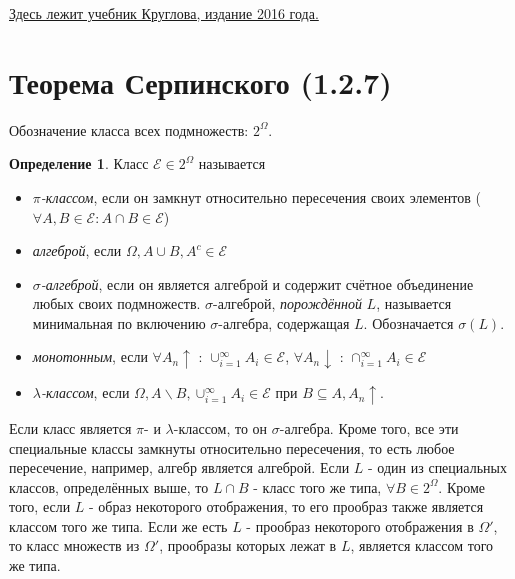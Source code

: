 \documentclass[16pt]{article}
\theoremstyle{definition}
\newtheorem{definition}[theorem]{Определение}
\begin{document}
\href{https://yadi.sk/d/d-ti\_TZi3Mh3Ri/7\%20sem/\%D0\%94\%D0\%93\%D0\%A1\%D0\%9F}{Здесь лежит учебник Круглова, издание 2016 года.}

\newpage

\section{Теорема Серпинского (1.2.7)}
Обозначение класса всех подмножеств: $2^\Omega$.
\begin{definition}
Класс $\mathcal{E} \in 2^\Omega$ называется 
\begin{itemize}
    \item \textit{$\pi$-классом}, если он замкнут относительно пересечения своих элементов ($\forall A, B \in \mathcal{E} : A \cap B \in \mathcal{E}$)
    \item \textit{алгеброй}, если $\Omega, A \cup B, A^c \in \mathcal{E}$
    \item \textit{$\sigma$-алгеброй}, если он является алгеброй и содержит счётное объединение любых своих подмножеств. $\sigma$-алгеброй, \textit{порождённой} $L$, называется минимальная по включению $\sigma$-алгебра, содержащая $L$. Обозначается $\sigma(L)$. 
    \item \textit{монотонным}, если $\forall A_n \uparrow$ : $\cup_{i=1}^\infty A_i \in \mathcal{E}$, $\forall A_n \downarrow$ : $\cap_{i=1}^\infty A_i \in \mathcal{E}$
    \item \textit{$\lambda$-классом}, если $\Omega, A \backslash B, \cup_{i=1}^\infty A_i \in \mathcal{E}$ при $B \subseteq A, A_n \uparrow$.
\end{itemize}
\end{definition}
Если класс является $\pi$- и $\lambda$-классом, то он $\sigma$-алгебра. Кроме того, все эти специальные классы замкнуты относительно пересечения, то есть любое пересечение, например, алгебр является алгеброй. \newline
Если $L$ - один из специальных классов, определённых выше, то $L \cap B$ - класс того же типа, $\forall B \in 2^\Omega$. Кроме того, если $L$ - образ некоторого отображения, то его прообраз также является классом того же типа. Если же есть $L$ - прообраз некоторого отображения в $\Omega'$, то класс множеств из $\Omega'$, прообразы которых лежат в $L$, является классом того же типа.
\end{document}

